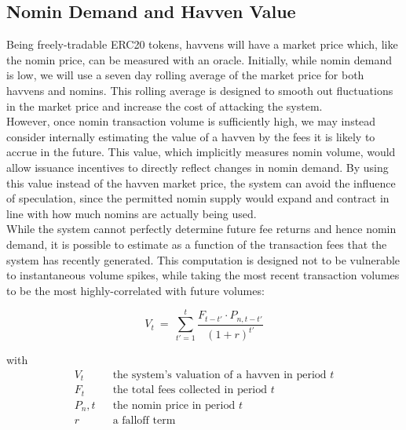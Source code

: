 \newpage

\subsection{Nomin Demand and Havven Value}

\noindent Being freely-tradable ERC20 tokens, havvens will have a market
price which, like the nomin price, can be measured with an oracle. Initially,
while nomin demand is low, we will use a seven day rolling average of the
market price for both havvens and nomins. This rolling average is designed to
smooth out fluctuations in the market price and increase the cost of
attacking the system.\\

\noindent However, once nomin transaction volume is sufficiently high, we may
instead consider internally estimating the value of a havven by the fees it
is likely to accrue in the future. This value, which implicitly measures
nomin volume, would allow issuance incentives to directly reflect changes in
nomin demand. By using this value instead of the havven market price, the
system can avoid the influence of speculation, since the permitted nomin
supply would expand and contract in line with how much nomins are actually
being used. \\

\noindent While the system cannot perfectly determine future fee returns and
hence nomin demand, it is possible to estimate as a function of the
transaction fees that the system has recently generated. This computation is
designed not to be vulnerable to instantaneous volume spikes, while taking
the most recent transaction volumes to be the most highly-correlated with
future volumes:
\vspace{3mm}

\begin{equation}
    V_{t} \ = \ \sum_{t'=1}^{t} \frac{F_{t - t'} \cdot P_{n,t - t'}}{(1 + r)^{t'}} \label{eq:price}
\end{equation}

with
\begin{align*} 
V_{t} \ \ & \text{ the system's valuation of a havven in period } t  \\
F_t \ \ & \text{ the total fees collected in period } t\\
P_n,t \ \ & \text{ the nomin price in period } t\\
r \ \ & \text{ a falloff term}  \\
\end{align*}

